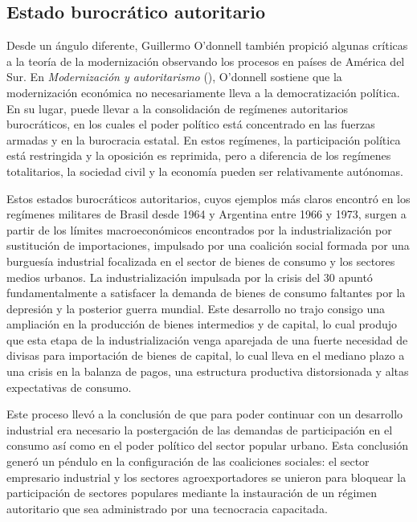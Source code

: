 \documentclass{article}
\begin{document}
\subsection{Estado burocrático autoritario}

Desde un ángulo diferente, Guillermo O'donnell también propició algunas críticas a la 
teoría de la modernización observando los procesos en países de América del Sur. 
En \textit{Modernización y autoritarismo} (\citeyear{o1972modernizacion}), O'donnell
sostiene que la modernización económica no necesariamente lleva a la democratización
política. En su lugar, puede llevar a la consolidación de regímenes autoritarios
burocráticos, en los cuales el poder político está concentrado en las fuerzas armadas
y en la burocracia estatal. En estos regímenes, la participación política está
restringida y la oposición es reprimida, pero a diferencia de los regímenes totalitarios,
la sociedad civil y la economía pueden ser relativamente autónomas.

Estos estados burocráticos autoritarios, cuyos ejemplos más claros encontró en los
regímenes militares de Brasil desde 1964 y Argentina entre 1966 y 1973, surgen a partir
de los límites macroeconómicos encontrados por la industrialización por sustitución de
importaciones, impulsado por una coalición social formada por una burguesía industrial
focalizada en el sector de bienes de consumo y los sectores medios urbanos. La 
industrialización impulsada por la crisis del 30 apuntó fundamentalmente a satisfacer
la demanda de bienes de consumo faltantes por la depresión y la posterior guerra mundial.
Este desarrollo no trajo consigo una ampliación en la producción de bienes intermedios y de
capital, lo cual produjo que esta etapa de la industrialización venga aparejada de una 
fuerte necesidad de divisas para importación de bienes de capital, lo cual lleva en el
mediano plazo a una crisis en la balanza de pagos, una estructura productiva distorsionada
y altas expectativas de consumo.

Este proceso llevó a la conclusión de que para poder continuar con un desarrollo 
industrial era necesario la postergación de las demandas de participación en el consumo
así como en el poder político del sector popular urbano. Esta conclusión generó un péndulo
en la configuración de las coaliciones sociales: el sector empresario industrial y los
sectores agroexportadores se unieron para bloquear la participación de sectores populares
mediante la instauración de un régimen autoritario que sea administrado por una tecnocracia
capacitada.
\end{document}
